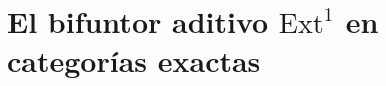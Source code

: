 \documentclass[tesis]{subfiles}
\begin{document}

%
%

\section{El bifuntor aditivo $\text{Ext}^1$ en categorías exactas} \label{Sec: El bifuntor aditivo Ext1 en categorías exactas}
\end{document}

